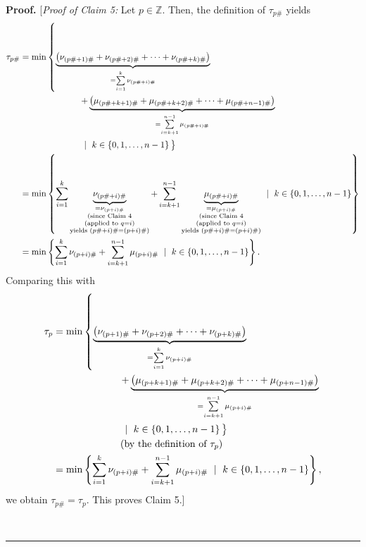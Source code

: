 \documentclass[numbers=enddot,12pt,final,onecolumn,notitlepage]{scrartcl}%
\theoremstyle{definition}
\newenvironment{proof}[1][Proof]{\noindent\textbf{#1.} }{\ \rule{0.5em}{0.5em}}
\let\sumnonlimits\sum
\renewcommand{\sum}{\sumnonlimits\limits}
\newenvironment{verlong}{}{}
\begin{document}
\begin{proof}
\begin{verlong}
[\textit{Proof of Claim 5:} Let $p\in\mathbb{Z}$. Then, the definition of
$\tau_{p\#}$ yields%
\begin{align*}
\tau_{p\#}  &  =\min\left\{  \underbrace{\left(  \nu_{\left(  p\#+1\right)
\#}+\nu_{\left(  p\#+2\right)  \#}+\cdots+\nu_{\left(  p\#+k\right)
\#}\right)  }_{=\sum_{i=1}^{k}\nu_{\left(  p\#+i\right)  \#}}\right. \\
&  \ \ \ \ \ \ \ \ \ \ \ \ \ \ \ \ \ \ \ \ \left.  +\underbrace{\left(
\mu_{\left(  p\#+k+1\right)  \#}+\mu_{\left(  p\#+k+2\right)  \#}+\cdots
+\mu_{\left(  p\#+n-1\right)  \#}\right)  }_{=\sum_{i=k+1}^{n-1}\mu_{\left(
p\#+i\right)  \#}}\right. \\
&  \ \ \ \ \ \ \ \ \ \ \ \ \ \ \ \ \ \ \ \ \left.  \ \mid\ k\in\left\{
0,1,\ldots,n-1\right\}
\vphantom{\left(\nu_{\left(j+1\right)\#}\right)}\right\} \\
&  =\min\left\{  \sum_{i=1}^{k}\underbrace{\nu_{\left(  p\#+i\right)  \#}%
}_{\substack{=\nu_{\left(  p+i\right)  \#}\\\text{(since Claim 4}%
\\\text{(applied to }q=i\text{)}\\\text{yields }\left(  p\#+i\right)
\#=\left(  p+i\right)  \#\text{)}}}+\sum_{i=k+1}^{n-1}\underbrace{\mu_{\left(
p\#+i\right)  \#}}_{\substack{=\mu_{\left(  p+i\right)  \#}\\\text{(since
Claim 4}\\\text{(applied to }q=i\text{)}\\\text{yields }\left(  p\#+i\right)
\#=\left(  p+i\right)  \#\text{)}}}\ \mid\ k\in\left\{  0,1,\ldots
,n-1\right\}  \right\} \\
&  =\min\left\{  \sum_{i=1}^{k}\nu_{\left(  p+i\right)  \#}+\sum_{i=k+1}%
^{n-1}\mu_{\left(  p+i\right)  \#}\ \mid\ k\in\left\{  0,1,\ldots,n-1\right\}
\right\}  .
\end{align*}
Comparing this with%
\begin{align*}
\tau_{p}  &  =\min\left\{  \underbrace{\left(  \nu_{\left(  p+1\right)
\#}+\nu_{\left(  p+2\right)  \#}+\cdots+\nu_{\left(  p+k\right)  \#}\right)
}_{=\sum_{i=1}^{k}\nu_{\left(  p+i\right)  \#}}\right. \\
&  \ \ \ \ \ \ \ \ \ \ \ \ \ \ \ \ \ \ \ \ \left.  +\underbrace{\left(
\mu_{\left(  p+k+1\right)  \#}+\mu_{\left(  p+k+2\right)  \#}+\cdots
+\mu_{\left(  p+n-1\right)  \#}\right)  }_{=\sum_{i=k+1}^{n-1}\mu_{\left(
p+i\right)  \#}}\right. \\
&  \ \ \ \ \ \ \ \ \ \ \ \ \ \ \ \ \ \ \ \ \left.  \ \mid\ k\in\left\{
0,1,\ldots,n-1\right\}
\vphantom{\left(\nu_{\left(j+1\right)\#}\right)}\right\} \\
&  \ \ \ \ \ \ \ \ \ \ \ \ \ \ \ \ \ \ \ \ \left(  \text{by the definition of
}\tau_{p}\right) \\
&  =\min\left\{  \sum_{i=1}^{k}\nu_{\left(  p+i\right)  \#}+\sum_{i=k+1}%
^{n-1}\mu_{\left(  p+i\right)  \#}\ \mid\ k\in\left\{  0,1,\ldots,n-1\right\}
\right\}  ,
\end{align*}
we obtain $\tau_{p\#}=\tau_{p}$. This proves Claim 5.]
\end{verlong}


\end{proof}
\end{document}
